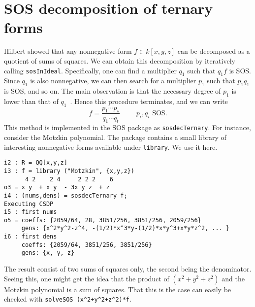 \documentclass[11pt]{amsart}
\theoremstyle{plain}%
\theoremstyle{definition}
\theoremstyle{remark}
\newcommand{\SOS}{\textsc{SOS}\xspace}
\begin{document}
\section{SOS decomposition of ternary forms}

Hilbert showed that any nonnegative form $f\in k[x,y,z]$ can be decomposed as a quotient of sums of squares.
We can obtain this decomposition by iteratively calling \verb|sosInIdeal|.
Specifically, one can find a multiplier $q_{1}$ such that $q_{1}f$ is SOS.
Since $q_1$ is also nonnegative, we can then search for a multiplier $p_{1}$ such that $p_{1}q_{1}$ is SOS, and so on.
The main observation is that the necessary degree of $p_{1}$ is lower than that of $q_{1}$~\cite{de2004products}.
Hence this procedure terminates, and we can write 
\[
  f = \frac{p_{1}\cdots p_{s}}{q_{1}\cdots q_{t}} \qquad \text {
    $p_{i},q_{i}$ SOS}.
\]
This method is implemented in the \SOS package as \verb|sosdecTernary|.  
For instance, consider the Motzkin polynomial.
The package contains a small library of interesting nonnegative forms available under \verb|library|.
We use it here.
{\small
\begin{verbatim}
i2 : R = QQ[x,y,z]
i3 : f = library ("Motzkin", {x,y,z})
      4 2    2 4     2 2 2    6
o3 = x y  + x y  - 3x y z  + z
i4 : (nums,dens) = sosdecTernary f;
Executing CSDP
i5 : first nums
o5 = coeffs: {2059/64, 28, 3851/256, 3851/256, 2059/256}
     gens: {x^2*y^2-z^4, -(1/2)*x^3*y-(1/2)*x*y^3+x*y*z^2, ... }
i6 : first dens
     coeffs: {2059/64, 3851/256, 3851/256}
     gens: {x, y, z}
\end{verbatim}
}
The result consist of two sums of squares only, the second being the denominator.
Seeing this, one might get the idea that the product of $(x^{2}+y^{2}+z^{2})$ and the Motzkin polynomial is a sum of squares.
That this is the case can easily be checked with \verb|solveSOS (x^2+y^2+z^2)*f|.


\end{document}
